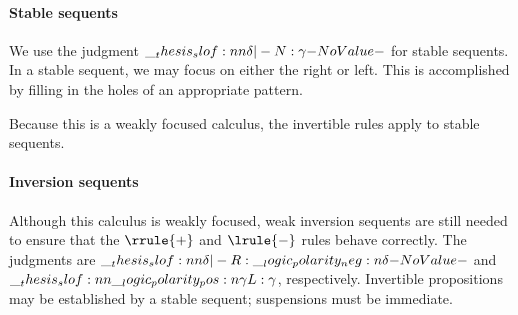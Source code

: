 \paragraph{Stable se{q}uents}
We use the judgment $\slof{\delta |- N : \gamma}$ for stable sequents.
In a stable sequent, we may focus on either the right or left.
This is accomplished by filling in the holes of an appropriate pattern.
Because this is a weakly focused calculus, the invertible rules apply to stable sequents.

\paragraph{Inversion seq\-uents}
Although this calculus is weakly focused, weak inversion sequents are still needed to ensure that the $\rrule{+}$ and $\lrule{-}$ rules behave correctly.
The judgments are $\slof{\delta |- R : \n{\delta}}$ and $\slof{\p{\gamma} |- L : \gamma}$, respectively.
Invertible propositions may be established by a stable sequent; suspensions must be immediate.


